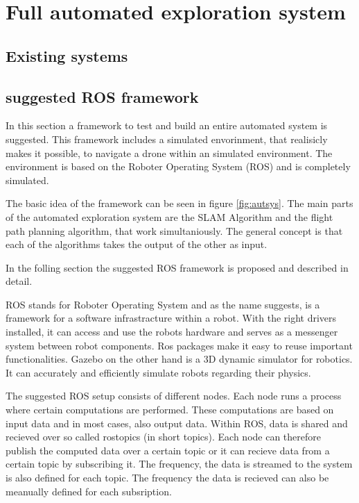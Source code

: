\chapter{Full automated exploration system}

\section{Existing systems}

	
\section{suggested ROS framework} \label{rosframe}
	
	In this section a framework to test and build an entire automated system is suggested. This framework includes a 
	simulated envorinment, that realisicly makes it possible, to navigate a drone within an simulated environment. The environment 
	is based on the Roboter Operating System (ROS) and is completely simulated. 
	
	The basic idea of the framework can be seen in figure \ref{fig:autsys}. The main parts of the automated exploration system are the SLAM Algorithm
	and the flight path planning algorithm, that work simultaniously. The general concept is that each of the algorithms takes the output of the other as 
	input. 
	
	In the folling section the suggested ROS framework is proposed and described in detail. 
	
		
	ROS stands for Roboter Operating System and as the name suggests, is a framework for a software infrastracture within a robot. With the right drivers installed, 
	it can access and use the robots hardware and serves as a messenger system between robot components. Ros packages make it easy to 
	reuse important functionalities. Gazebo on the other hand is a 3D dynamic simulator for robotics. It can accurately and efficiently simulate robots regarding
	their physics. 
	
	The suggested ROS setup consists of different nodes. Each node runs a process where certain computations are performed. These computations are based on input data
	and in most cases, also output data. Within ROS, data is shared and recieved over so called rostopics (in short topics). Each node can therefore publish the computed 
	data over a certain topic or it can recieve data from a certain topic by subscribing it. The frequency, the data is streamed to the system is also defined for each 
	topic. The frequency the data is recieved can also be meanually defined for each subsription. 
	
